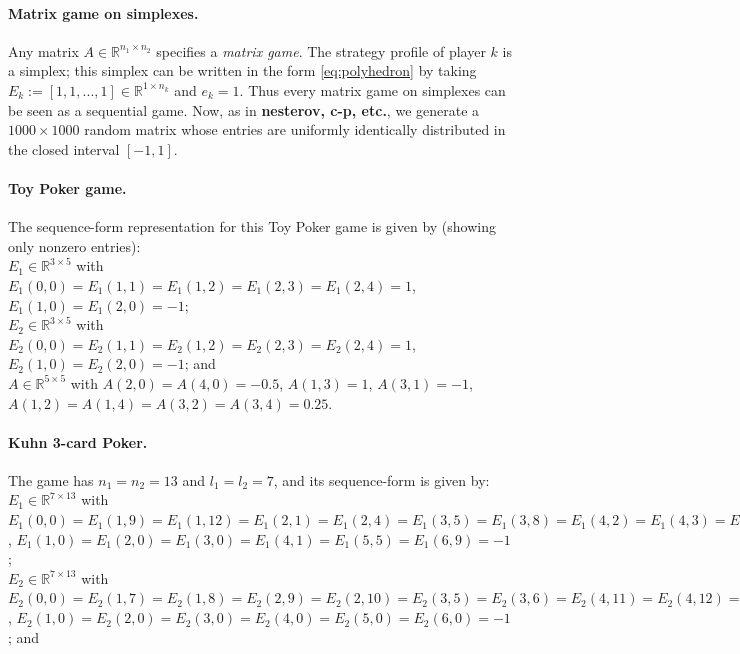 \documentclass{article} %
\begin{document}
\paragraph{\textbf{Matrix game on simplexes.}}
Any matrix $A \in \mathbb{R}^{n_1 \times n_2}$ specifies a
\textit{matrix game}. The strategy profile of player $k$ is a simplex;
this simplex can be written in the form \eqref{eq:polyhedron} by
taking $E_k := [1, 1, ..., 1] \in \mathbb{R}^{1 \times n_k}$ and $e_k
= 1$. Thus every matrix game on simplexes can be seen as a sequential
game. Now, as in \textbf{nesterov, c-p, etc.}, we generate a $1000
\times 1000$ random matrix whose entries are uniformly identically
distributed in the closed interval $[-1, 1]$.

\paragraph{\textbf{Toy Poker game.}}
The sequence-form representation for this Toy Poker game is given by
(showing only nonzero entries):\\

$E_1 \in \mathbb{R}^{3 \times 5}$ with $E_1(0,0) = E_1(1,1) =
E_1(1,2) = E_1(2,3) = E_1(2,4) = {1}$,
$E_1(1,0) = E_1(2,0) = {-1}$; \\

$E_2 \in \mathbb{R}^{3 \times 5}$ with $E_2(0,0) = E_2(1,1) = E_2(1,2)
= E_2(2,3) = E_2(2,4) = {1}$, $E_2(1,0) = E_2(2,0) =
{-1}$; and \\

$A \in \mathbb{R}^{5 \times 5}$ with $A(2,0) =
A(4,0) = {-0.5}$, $A(1,3) = {1}$, $A(3,1) =
{-1}$, $A(1,2) = A(1,4) = A(3,2) = A(3,4) = {0.25}$.


\paragraph{{Kuhn 3-card Poker.}}
The game has $n_1 = n_2 = 13$ and $l_1 = l_2 = 7$, and its
sequence-form is given by:\\

$E_1 \in \mathbb{R}^{7 \times 13}$ with $E_1(0,0) = E_1(1,9) =
E_1(1,12) = E_1(2,1) = E_1(2,4) = E_1(3,5) =
E_1(3,8) = E_1(4,2) = E_1(4,3) = E_1(5,6) = E_1(5,7) = E_1(6,10) =
E_1(6,11) = {1}$, $E_1(1,0) = E_1(2,0) = E_1(3,0) = E_1(4,1) =
E_1(5,5) = E_1(6,9) = {-1}$; \\

 $E_2 \in \mathbb{R}^{7 \times 13}$ with
$E_2(0,0) = E_2(1,7) = E_2(1,8) = E_2(2,9) = E_2(2,10) = E_2(3,5) =
E_2(3,6) = E_2(4,11) = E_2(4,12) = E_2(5,1) = E_2(5,2) = E_2(6,3) =
E_2(6,4) = {1}$, $E_2(1,0) = E_2(2,0) = E_2(3,0) = E_2(4,0) =
E_2(5,0) = E_2(6,0) = {-1}$; and \\
\end{document}
